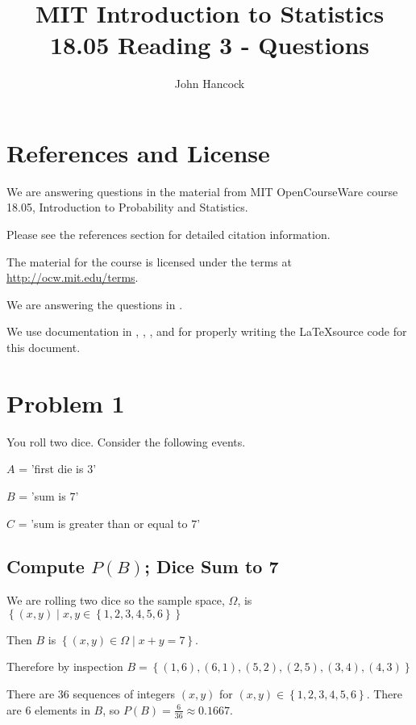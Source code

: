 \documentclass[a4paper,11pt]{article}
\author{John Hancock}
\title{MIT Introduction to Statistics 18.05 Reading 3 - Questions }
\begin{document}
\maketitle
\tableofcontents
\section{References and License}
We are answering questions in the material from MIT OpenCourseWare
course 18.05, Introduction to Probability and Statistics.

Please see the references section for detailed citation information.

The material for the course is licensed under the terms at 
\url{http://ocw.mit.edu/terms}.

We are answering the questions in \cite{reading3Questions}.

We use documentation in \cite{latexSymbols}, \cite{latexMultiLine},
\cite{latexBold}, and \cite{latexForLatex} for properly writing the
\LaTeX source code for this document.
 
\section{Problem 1}
You roll two dice. Consider the following events. 

$A$ = 'first die is $3$'

$B$ = 'sum is $7$' 

$C$ = 'sum is greater than or equal to $7$'

\subsection{Compute $P\left(B\right)$; Dice Sum to 7}

We are rolling two dice so the sample space, $\Omega$, is 
$\left\{ \left( x,y \right) 
  \mid x, y \in \left\{ 1,2,3,4,5,6 \right\} \right\}$

Then $B$ is $ \left\{ \left( x, y \right) \in \Omega 
  \mid x + y = 7 \right\}$.

Therefore by inspection $B = \left\{ \left(1, 6 \right), 
  \left(6, 1 \right),
  \left(5, 2 \right),
  \left(2, 5 \right),
  \left(3, 4 \right),
  \left(4, 3 \right)
  \right\}$
  
There are $36$ sequences of integers $\left(x, y \right)$ for
$\left( x, y \right) \in \left\{1, 2, 3, 4, 5, 6 \right\}$.  There are $6$ elements
in $B$, so $P\left( B \right) = \frac{6}{36} \approx 0.1667$.
\end{document}
